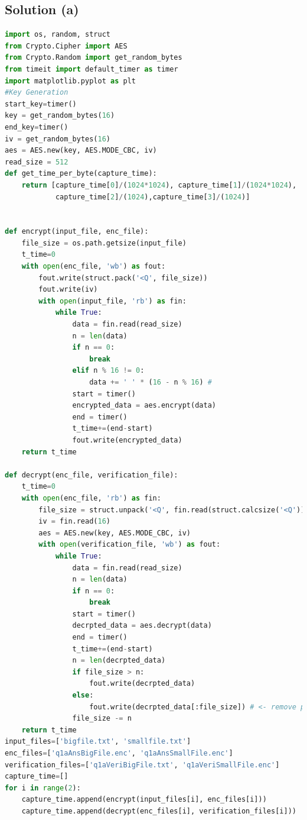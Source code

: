 \documentclass[12pt]{article}%
\begin{document}
\subsection{Solution (a)}
\begin{lstlisting}[language=Python]
import os, random, struct
from Crypto.Cipher import AES
from Crypto.Random import get_random_bytes
from timeit import default_timer as timer
import matplotlib.pyplot as plt
#Key Generation
start_key=timer()
key = get_random_bytes(16)
end_key=timer()
iv = get_random_bytes(16)
aes = AES.new(key, AES.MODE_CBC, iv)
read_size = 512
def get_time_per_byte(capture_time):
    return [capture_time[0]/(1024*1024), capture_time[1]/(1024*1024),
            capture_time[2]/(1024),capture_time[3]/(1024)]


def encrypt(input_file, enc_file):
    file_size = os.path.getsize(input_file)
    t_time=0
    with open(enc_file, 'wb') as fout:
        fout.write(struct.pack('<Q', file_size))
        fout.write(iv)
        with open(input_file, 'rb') as fin:
            while True:
                data = fin.read(read_size)
                n = len(data)
                if n == 0:
                    break
                elif n % 16 != 0:
                    data += ' ' * (16 - n % 16) #
                start = timer()
                encrypted_data = aes.encrypt(data)
                end = timer()
                t_time+=(end-start)
                fout.write(encrypted_data)
    return t_time

def decrypt(enc_file, verification_file):
    t_time=0
    with open(enc_file, 'rb') as fin:
        file_size = struct.unpack('<Q', fin.read(struct.calcsize('<Q')))[0]
        iv = fin.read(16)
        aes = AES.new(key, AES.MODE_CBC, iv)
        with open(verification_file, 'wb') as fout:
            while True:
                data = fin.read(read_size)
                n = len(data)
                if n == 0:
                    break
                start = timer()
                decrpted_data = aes.decrypt(data)
                end = timer()
                t_time+=(end-start)
                n = len(decrpted_data)
                if file_size > n:
                    fout.write(decrpted_data)
                else:
                    fout.write(decrpted_data[:file_size]) # <- remove padding on last block
                file_size -= n
    return t_time
input_files=['bigfile.txt', 'smallfile.txt']
enc_files=['q1aAnsBigFile.enc', 'q1aAnsSmallFile.enc']
verification_files=['q1aVeriBigFile.txt', 'q1aVeriSmallFile.enc']
capture_time=[]
for i in range(2):
    capture_time.append(encrypt(input_files[i], enc_files[i]))
    capture_time.append(decrypt(enc_files[i], verification_files[i]))


\end{lstlisting}
\end{document}
